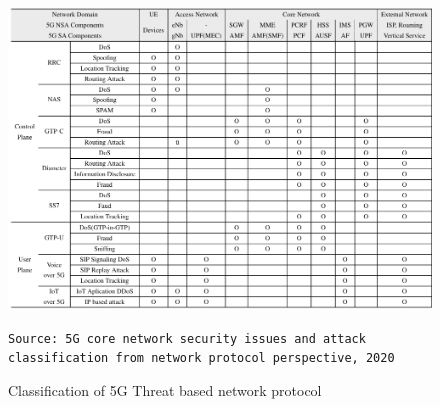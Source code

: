 \documentclass[english]{article}
\begin{document}
\begin{figure}[h]
	\centering
	\includegraphics[width=\textwidth]{ATTACCHI.png}
	\caption{Classification of 5G Threat based network protocol}\label{fig:attacco}
	\texttt{Source: 5G core network security issues and attack classification from
		network protocol perspective, 2020}
\end{figure}

\end{document}
